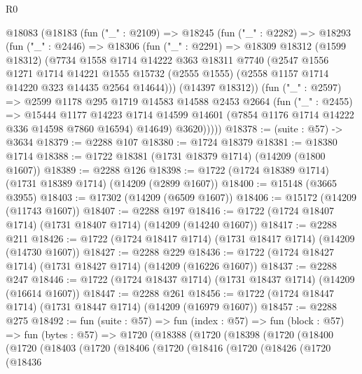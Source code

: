 \begin{lexlean}{R0}
\begin{coremodule}
  @18083
    (@18183
      (fun ("_" : @2109) =>
      @18245
        (fun ("_" : @2282) =>
        @18293
          (fun ("_" : @2446) =>
          @18306
            (fun ("_" : @2291) =>
            @18309
              @18312
              (@1599 @18312)
              (@7734
                @1558
                @1714
                @14222
                @363
                @18311
                @7740
                (@2547
                  @1556
                  @1271
                  @1714
                  @14221
                  @1555
                  @15732
                  (@2555 @1555)
                  (@2558 @1157 @1714 @14220 @323 @14435 @2564 @14644)))
              (@14397 @18312))
            (fun ("_" : @2597) =>
            @2599
              @1178
              @295
              @1719
              @14583
              @14588
              @2453
              @2664
              (fun ("_" : @2455) =>
              @15444
                @1177
                @14223
                @1714
                @14599
                @14601
                (@7854 @1176 @1714 @14222 @336 @14598 @7860 @16594)
                @14649)
              @3620)))))
@18378 := (suite : @57) -> @3634
@18379 := @2288 @107
@18380 := @1724 @18379
@18381 := @18380 @1714
@18388 := @1722 @18381 (@1731 @18379 @1714) (@14209 (@1800 @1607))
@18389 := @2288 @126
@18398 := @1722 (@1724 @18389 @1714) (@1731 @18389 @1714) (@14209 (@2899 @1607))
@18400 := @15148 (@3665 @3955)
@18403 := @17302 (@14209 (@6509 @1607))
@18406 := @15172 (@14209 (@11743 @1607))
@18407 := @2288 @197
@18416 := @1722 (@1724 @18407 @1714) (@1731 @18407 @1714) (@14209 (@14240 @1607))
@18417 := @2288 @211
@18426 := @1722 (@1724 @18417 @1714) (@1731 @18417 @1714) (@14209 (@14730 @1607))
@18427 := @2288 @229
@18436 := @1722 (@1724 @18427 @1714) (@1731 @18427 @1714) (@14209 (@16226 @1607))
@18437 := @2288 @247
@18446 := @1722 (@1724 @18437 @1714) (@1731 @18437 @1714) (@14209 (@16614 @1607))
@18447 := @2288 @261
@18456 := @1722 (@1724 @18447 @1714) (@1731 @18447 @1714) (@14209 (@16979 @1607))
@18457 := @2288 @275
@18492 := fun (suite : @57) =>
  fun (index : @57) =>
  fun (block : @57) =>
  fun (bytes : @57) =>
  @1720
    (@18388
      (@1720
        (@18398
          (@1720
            (@18400
              (@1720
                (@18403
                  (@1720
                    (@18406
                      (@1720
                        (@18416
                          (@1720
                            (@18426
                              (@1720
                                (@18436

\end{coremodule}
\end{lexlean}
